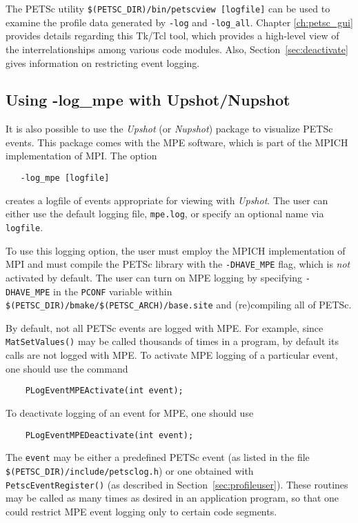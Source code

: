 The PETSc utility {\tt \$(PETSC\_DIR)/bin/petscview [logfile]}
 can be used to examine the profile data generated by
{\tt -log} and {\tt -log\_all}.  Chapter \ref{ch:petsc_gui} provides
details regarding this Tk/Tcl tool, which provides a high-level view of
the interrelationships among various code modules. Also,
Section~\ref{sec:deactivate} gives information on restricting event logging.

\subsection{Using -log\_mpe with Upshot/Nupshot}
\label{sec:mpelogs}

It is also possible to use the {\em Upshot} (or {\em Nupshot}) package
\cite{upshot}    to visualize PETSc events. 
This package comes with the MPE software, which is part of the MPICH
\cite{mpich-web-page} implementation of MPI.
The option 
\begin{verbatim}
   -log_mpe [logfile]
\end{verbatim}
creates a logfile of events appropriate for viewing with {\em Upshot}.
The user can either use the default logging file, {\tt mpe.log}, or
specify an optional name via {\tt logfile}.  

To use this logging
option, the user must employ the MPICH implementation of MPI and must
compile the PETSc library with the {\tt -DHAVE\_MPE} flag, which is
{\em not} activated by default. The user can turn on MPE logging by
specifying {\tt -DHAVE\_MPE} in the {\tt PCONF} variable within
{\tt \$(PETSC\_DIR)/bmake/\$(PETSC\_ARCH)/base.site} and
(re)compiling all of PETSc.

By default, not all PETSc events are logged with MPE. For example,
since {\tt MatSetValues()} may be called thousands of times in a program,
by default its calls are not logged with MPE. To activate MPE logging of
a particular event, one should use the command 
\begin{verbatim}
    PLogEventMPEActivate(int event);
\end{verbatim}
To deactivate logging of an event for MPE, one should use 
\begin{verbatim}
    PLogEventMPEDeactivate(int event);
\end{verbatim}
The {\tt event} may be either a predefined PETSc event (as listed in
the file {\tt \$(PETSC\_DIR)/include/petsclog.h}) or one obtained with
{\tt PetscEventRegister()} (as described in
Section~\ref{sec:profileuser}).  These routines may be called as many
times as desired in an application program, so that one could restrict
MPE event logging only to certain code segments.

